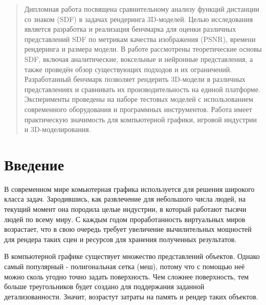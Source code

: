 \documentclass[a4paper,hidelinks,12pt]{article}
\begin{document}
\begin{abstract}
	Дипломная работа посвящена сравнительному анализу функций дистанции со знаком (SDF) в 
	задачах рендеринга 3D-моделей. Целью исследования является разработка и реализация бенчмарка для оценки различных 
	представлений SDF по метрикам качества изображения (PSNR), времени рендеринга и размера модели. В работе 
	рассмотрены теоретические основы SDF, включая аналитические, воксельные и нейронные представления, а также 
	проведён обзор существующих подходов и их ограничений. Разработанный бенчмарк позволяет рендерить 3D-модели в 
	различных представлениях и сравнивать их производительность на единой платформе. Эксперименты проведены на наборе
	 тестовых моделей с использованием современного оборудования и программных инструментов. Работа имеет практическую значимость для компьютерной графики, игровой индустрии и 3D-моделирования.
\end{abstract}

\newpage

\tableofcontents

\newpage

\section{Введение}

В современном мире комьютерная графика используется для решения широкого класса задач. Зародившись, как развлечение для небольшого числа людей, на текущий момент она породила целые индустрии, в который работают тысячи людей по всему миру.
С каждым годом проработанность виртуальных миров возрастает, что в свою очередь требует увеличение вычилительных мощностей для рендера таких сцен и ресурсов для хранения полученных результатов.

В компьютерной графике существует множество представлений объектов. Однако самый популярный - полигональная сетка (меш), потому что 
с помощью неё можно сколь угодно точно задать поверхность. Чем сложнее поверхность, тем больше треугольников будет создано для поддержания заданной детализованности. Значит, возрастут затраты на память и рендер таких объектов.
\end{document}

